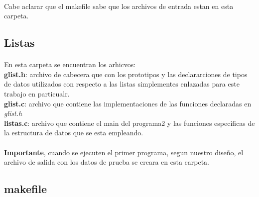 \documentclass{article}
\begin{document}
	\paragraph{}
	Cabe aclarar que el makefile sabe que los archivos de entrada estan en esta carpeta.
	
	\subsection{Listas}
	\paragraph{}
	En esta carpeta se encuentran los arhicvos: \\
	\textbf{glist.h}: archivo de cabecera que con los prototipos y las declararciones de tipos de datos utilizados con respecto a las listas simplementes enlazadas para este trabajo en particualr.\\
	\textbf{glist.c}: archivo que contiene las implementaciones de las funciones declaradas en \emph{glist.h}\\
	\textbf{listas.c}: archivo que contiene el main del programa2 y las funciones especificas de la estructura de datos que se esta empleando.\\
	\paragraph{}
	\textbf{Importante}, cuando se ejecuten el primer programa, segun nuestro diseño, el archivo de salida con los datos de prueba se creara en esta carpeta.
	
	\subsection{makefile}
\end{document}
